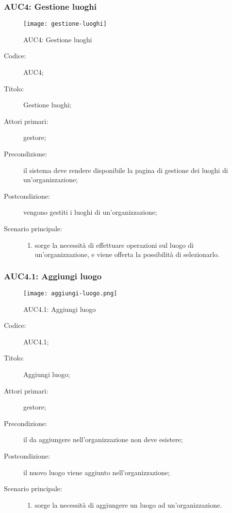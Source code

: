 \documentclass[../../../analisi-dei-requisiti.tex]{subfiles}
\begin{document}
\subsubsection{AUC4: Gestione luoghi}%
\label{subs:AUC4}

\begin{figure}[H]
  \centering
  \texttt{[image: gestione-luoghi]}
  \caption{AUC4: Gestione luoghi}%
  \label{fig:AUC4}
\end{figure}

\begin{description}
  \item[Codice:] AUC4;
  \item[Titolo:] Gestione luoghi;
  \item[Attori primari:] gestore;
  \item[Precondizione:] il sistema deve rendere disponibile la pagina di gestione dei luoghi di un'organizzazione;
  \item[Postcondizione:] vengono gestiti i luoghi di un'organizzazione;
  \item[Scenario principale:]
  \begin{enumerate}
    \item sorge la necessità di effettuare operazioni sul luogo di un'organizzazione, e viene offerta la possibilità di selezionarlo.
  \end{enumerate}
\end{description}

\subsubsection{AUC4.1: Aggiungi luogo}%
\label{subs:AUC4.1}

\begin{figure}[H]
  \centering
  \texttt{[image: aggiungi-luogo.png]}
  \caption{AUC4.1: Aggiungi luogo}%
  \label{fig:AUC4.1}
\end{figure}

\begin{description}
  \item[Codice:] AUC4.1;
  \item[Titolo:] Aggiungi luogo;
  \item[Attori primari:] gestore;
  \item[Precondizione:] il  da aggiungere nell'organizzazione non deve esistere;
  \item[Postcondizione:] il nuovo luogo viene aggiunto nell'organizzazione;
  \item[Scenario principale:]
  \begin{enumerate}
    \item sorge la necessità di aggiungere un luogo ad un'organizzazione.
  \end{enumerate}
\end{description}
\end{document}
